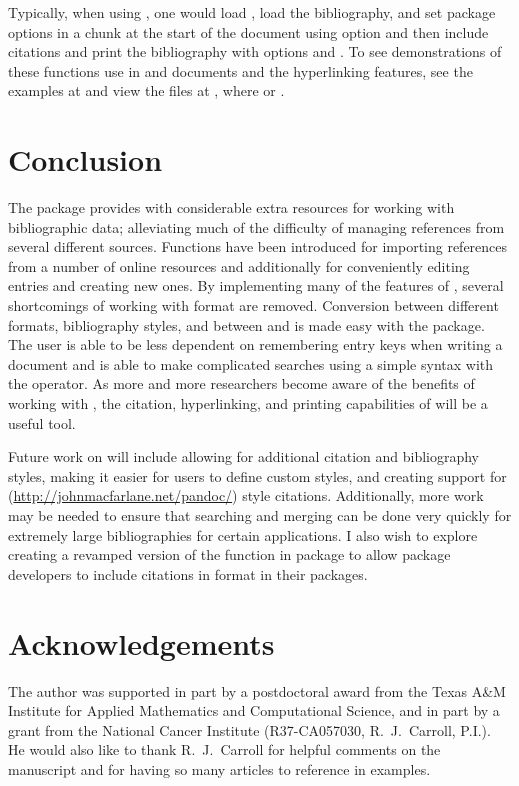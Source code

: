 \documentclass[article]{jss}\usepackage[]{graphicx}\usepackage[]{color}
\newcommand{\ourpkg}{\pkg{RefManageR}}
\newcommand{\bt}{\`{}}
\begin{document}
Typically, when using , one would load \ourpkg{}, load the bibliography, and set package options in a chunk at the start of the document using option  and then include citations and print the bibliography with options  and .  To see demonstrations of these functions use in  and  documents and the hyperlinking features, see the examples at  and view the files at , where  or .

\section{Conclusion}\label{sec_conc}
The \ourpkg{} package provides \R{} with considerable extra resources for working with bibliographic data; alleviating much of the difficulty of managing references from several different sources.  Functions have been introduced for importing references from a number of online resources and additionally for conveniently editing entries and creating new ones.  By implementing many of the features of \Biblatex{}, several shortcomings of working with \Bibtex{} format are removed. Conversion between different formats, bibliography styles, and between \Biblatex{} and \Bibtex{} is made easy with the package.  The user is able to be less dependent on remembering entry keys when writing a document and is able to make complicated searches using a simple syntax with the \code{\bt[\bt} operator.  As more and more researchers become aware of the benefits of working with , the citation, hyperlinking, and printing capabilities of \ourpkg{} will be a useful tool.

Future work on \ourpkg{} will include allowing for additional citation and bibliography styles,  making it easier for users to define custom styles, and creating support for  (\url{http://johnmacfarlane.net/pandoc/}) style citations.  Additionally, more work may be needed to ensure that searching and merging can be done very quickly for extremely large bibliographies for certain applications.  I also wish to explore creating a revamped version of the  function in package  to allow package developers to include citations in \Biblatex{} format in their packages.
\section*{Acknowledgements}
The author was supported in part by a postdoctoral award from the Texas A\&M Institute for Applied Mathematics and Computational Science, and in part by a grant from the National Cancer Institute (R37-CA057030, R.\ J.\ Carroll, P.I.).  He would also like to thank R.\ J.\ Carroll for helpful comments on the manuscript and for having so many articles to reference in examples.

\end{document}
